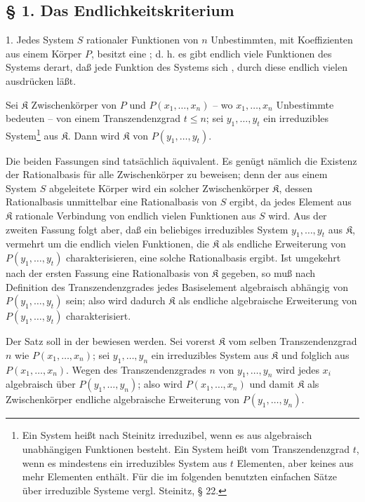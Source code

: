\subsection*{§ 1. Das Endlichkeitskriterium}

1.  Jedes System $S$ rationaler Funktionen von $n$ Unbestimmten, mit Koeffizienten aus einem Körper $P$, besitzt eine ; d. h. es gibt endlich viele Funktionen des Systems derart, daß jede Funktion des Systems sich , durch diese endlich vielen ausdrücken läßt.

 Sei $\mathfrak K$ Zwischenkörper von $P$ und $P(x_1,\ldots,x_n)$ -- wo $x_1,\ldots,x_n$ Unbestimmte bedeuten -- von einem Transzendenzgrad $t\leq n$; sei $y_1,\ldots,y_t$ ein irreduzibles System\footnote{Ein System heißt nach Steinitz irreduzibel, wenn es aus algebraisch unabhängigen Funktionen besteht. Ein System heißt vom Transzendenzgrad $t$, wenn es mindestens ein irreduzibles System aus $t$ Elementen, aber keines aus mehr Elementen enthält. Für die im folgenden benutzten einfachen Sätze über irreduzible Systeme vergl. Steinitz, § 22.} aus $\mathfrak K$. Dann wird $\mathfrak K$  von $P(y_1,\ldots,y_t)$.

Die beiden Fassungen sind tatsächlich äquivalent. Es genügt nämlich die Existenz der Rationalbasis für alle Zwischenkörper zu beweisen; denn der aus einem System $S$ abgeleitete Körper wird ein solcher Zwischenkörper $\mathfrak K$, dessen Rationalbasis unmittelbar eine Rationalbasis von $S$ ergibt, da jedes Element aus $\mathfrak K$ rationale Verbindung von endlich vielen Funktionen aus $S$ wird. Aus der zweiten Fassung folgt aber, daß ein beliebiges irreduzibles System $y_1,\ldots,y_t$ aus $\mathfrak K$, vermehrt um die endlich vielen Funktionen, die $\mathfrak K$ als endliche Erweiterung von $P(y_1,\ldots,y_t)$ charakterisieren, eine solche Rationalbasis ergibt. Ist umgekehrt nach der ersten Fassung eine Rationalbasis von $\mathfrak K$ gegeben, so muß nach Definition des Transzendenzgrades jedes Basiselement algebraisch abhängig von $P(y_1,\ldots,y_t)$ sein; also wird dadurch $\mathfrak K$ als endliche algebraische Erweiterung von $P(y_1,\ldots,y_t)$ charakterisiert.

Der Satz soll in der  bewiesen werden. Sei vorerst $\mathfrak K$ vom selben Transzendenzgrad $n$ wie $P(x_1,\ldots,x_n)$; sei $y_1,\ldots,y_n$ ein irreduzibles System aus $\mathfrak K$ und folglich aus $P(x_1,\ldots,x_n)$. Wegen des Transzendenzgrades $n$ von $y_1,\ldots,y_n$ wird jedes $x_i$ algebraisch über $P(y_1,\ldots,y_n)$; also wird $P(x_1,\ldots,x_n)$ und damit $\mathfrak K$ als Zwischenkörper endliche algebraische Erweiterung von $P(y_1,\ldots,y_n)$.

